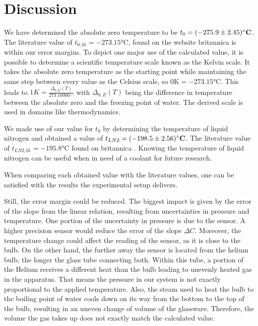 \section{Discussion}
    We have determined the absolute zero temperature to be $t_0 = (-275.9 \pm 2.45)\si{\bf\celsius}$.
    The literature value of $t_{0, \text{lit}} = -273.15 \si{\celsius}$, found on the website britannica \cite{literature_absolute_zero} is within our error margins.
    To depict one major use of the calculated value, it is possible to determine a scientific temperature scale known as the Kelvin scale.
    It takes the absolute zero temperature as the starting point while maintaining the same step between every value as the Celsius scale, so $0 \si{\kelvin} = -273.15 \si{\celsius}$.
    This leads to $1K = \frac{\Delta_{0, E}(T)}{273.16000\cdots}$ with $\Delta_{0, E}(T)$ being the difference in temperature between the absolute zero and the freezing point of water.
    The derived scale is used in domains like thermodynamics.

    We made use of our value for $t_0$ by determining the temperature of liquid nitrogen and obtained a value of $t_{LN2} = (-198.5 \pm 2.56)\si{\bf\celsius}$.
    The literature value of $t_{LN2, \text{lit}} = -195.8 \si{\celsius}$ found on britannica \cite{literature_liquid_nitrogen}.
    Knowing the temperature of liquid nitrogen can be useful when in need of a coolant for future research.

    When comparing each obtained value with the literature values, one can be satisfied with the results the experimental setup delivers.

    Still, the error margin could be reduced.
    The biggest impact is given by the error of the slope from the linear relation, resulting from uncertainties in pressure and temperature.
    One portion of the uncertainty in pressure is due to the sensor.
    A higher precision sensor would reduce the error of the slope $\Delta C$.
    Moreover, the temperature change could affect the reading of the sensor, as it is close to the bulb.
    On the other hand, the further away the sensor is located from the helium bulb, the longer the glass tube connecting both.
    Within this tube, a portion of the Helium receives a different heat than the bulb leading to unevenly heated gas in the apparatus.
    That means the pressure in our system is not exactly proportional to the applied temperature.
    Also, the steam used to heat the bulb to the boiling point of water cools down on its way from the bottom to the top of the bulb, resulting in an uneven change of volume of the glassware.
    Therefore, the volume the gas takes up does not exactly match the calculated value.

